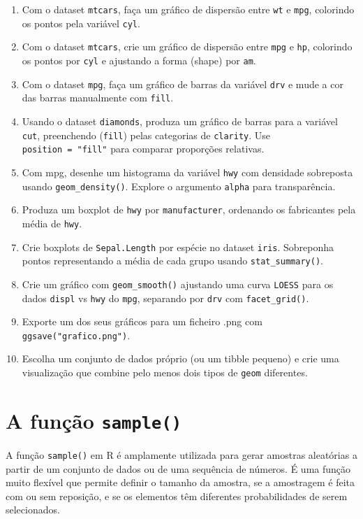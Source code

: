 \documentclass[
]{book}
\begin{document}
\begin{enumerate}
\def\labelenumi{\arabic{enumi}.}
\item
  Com o dataset \texttt{mtcars}, faça um gráfico de dispersão entre \texttt{wt} e \texttt{mpg}, colorindo os pontos pela variável \texttt{cyl}.
\item
  Com o dataset \texttt{mtcars}, crie um gráfico de dispersão entre \texttt{mpg} e \texttt{hp}, colorindo os pontos por \texttt{cyl} e ajustando a forma (shape) por \texttt{am}.
\item
  Com o dataset \texttt{mpg}, faça um gráfico de barras da variável \texttt{drv} e mude a cor das barras manualmente com \texttt{fill}.
\item
  Usando o dataset \texttt{diamonds}, produza um gráfico de barras para a variável \texttt{cut}, preenchendo (\texttt{fill}) pelas categorias de \texttt{clarity}. Use \texttt{position\ =\ "fill"} para comparar proporções relativas.
\item
  Com mpg, desenhe um histograma da variável \texttt{hwy} com densidade sobreposta usando \texttt{geom\_density()}. Explore o argumento \texttt{alpha} para transparência.
\item
  Produza um boxplot de \texttt{hwy} por \texttt{manufacturer}, ordenando os fabricantes pela média de \texttt{hwy}.
\item
  Crie boxplots de \texttt{Sepal.Length} por espécie no dataset \texttt{iris}. Sobreponha pontos representando a média de cada grupo usando \texttt{stat\_summary()}.
\item
  Crie um gráfico com \texttt{geom\_smooth()} ajustando uma curva \texttt{LOESS} para os dados \texttt{displ} vs \texttt{hwy} do \texttt{mpg}, separando por \texttt{drv} com \texttt{facet\_grid()}.
\item
  Exporte um dos seus gráficos para um ficheiro .png com \texttt{ggsave("grafico.png")}.
\item
  Escolha um conjunto de dados próprio (ou um tibble pequeno) e crie uma visualização que combine pelo menos dois tipos de \texttt{geom} diferentes.
\end{enumerate}

\chapter{\texorpdfstring{A função \texttt{sample()}}{A função sample()}}\label{a-funuxe7uxe3o-sample}

A função \texttt{sample()} em R é amplamente utilizada para gerar amostras
aleatórias a partir de um conjunto de dados ou de uma sequência de
números. É uma função muito flexível que permite definir o tamanho da
amostra, se a amostragem é feita com ou sem reposição, e se os elementos
têm diferentes probabilidades de serem selecionados.
\end{document}
